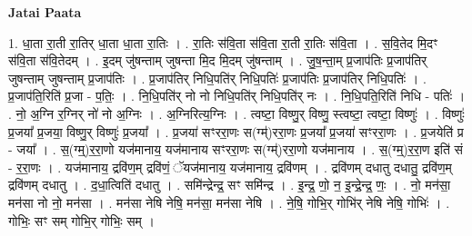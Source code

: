 \documentclass[17pt]{extarticle}
\begin{document}
\textbf{Jatai Paata} \newline

1. धा॒ता रा॒ती रा॒तिर् धा॒ता धा॒ता रा॒तिः । . रा॒तिः स॑वि॒ता स॑वि॒ता रा॒ती रा॒तिः स॑वि॒ता । . स॒वि॒तेद मि॒दꣳ स॑वि॒ता स॑वि॒तेदम् । . इ॒दम् जु॑षन्ताम् जुषन्ता मि॒द मि॒दम् जु॑षन्ताम् । . जु॒ष॒न्ता॒म् प्र॒जाप॑तिः प्र॒जाप॑तिर् जुषन्ताम् जुषन्ताम् प्र॒जाप॑तिः । . प्र॒जाप॑तिर् निधि॒पति॑र् निधि॒पतिः॑ प्र॒जाप॑तिः प्र॒जाप॑तिर् निधि॒पतिः॑ । . प्र॒जाप॑ति॒रिति॑ प्र॒जा - प॒तिः॒ । . नि॒धि॒पति॑र् नो नो निधि॒पति॑र् निधि॒पति॑र् नः । . नि॒धि॒पति॒रिति॑ निधि - पतिः॑ । . नो॒ अ॒ग्नि र॒ग्निर् नो॑ नो अ॒ग्निः । . अ॒ग्निरित्य॒ग्निः । . त्वष्टा॒ विष्णु॒र् विष्णु॒ स्त्वष्टा॒ त्वष्टा॒ विष्णुः॑ । . विष्णुः॑ प्र॒जया᳚ प्र॒जया॒ विष्णु॒र् विष्णुः॑ प्र॒जया᳚ । . प्र॒जया॑ सꣳररा॒णः स(ग्म्॑)ररा॒णः प्र॒जया᳚ प्र॒जया॑ सꣳररा॒णः । . प्र॒जयेति॑ प्र - जया᳚ । . स॒(ग्म्॒)र॒रा॒णो यज॑मानाय॒ यज॑मानाय सꣳररा॒णः स(ग्म्॑)ररा॒णो यज॑मानाय । . स॒(ग्म्॒)र॒रा॒ण इति॑ सं - र॒रा॒णः । . यज॑मानाय॒ द्रवि॑ण॒म् द्रवि॑णं॒ ॅयज॑मानाय॒ यज॑मानाय॒ द्रवि॑णम् । . द्रवि॑णम् दधातु दधातु॒ द्रवि॑ण॒म् द्रवि॑णम् दधातु । . द॒धा॒त्विति॑ दधातु । . समि॑न्द्रेन्द्र॒ सꣳ समि॑न्द्र । . इ॒न्द्र॒ णो॒ न॒ इ॒न्द्रे॒न्द्र॒ णः॒ । . नो॒ मन॑सा॒ मन॑सा नो नो॒ मन॑सा । . मन॑सा नेषि नेषि॒ मन॑सा॒ मन॑सा नेषि । . ने॒षि॒ गोभि॒र् गोभि॑र् नेषि नेषि॒ गोभिः॑ । . गोभिः॒ सꣳ सम् गोभि॒र् गोभिः॒ सम् । \newline
\end{document}
